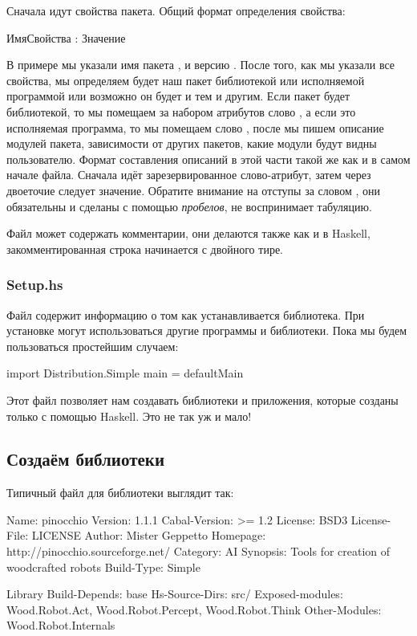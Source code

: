 Сначала идут свойства пакета. Общий формат определения свойства:

\begin{code}
ИмяСвойства : Значение
\end{code}

В примере мы указали имя пакета , и версию .
После того, как мы указали все свойства, мы определяем 
будет наш пакет библиотекой или исполняемой программой
или возможно он будет и тем и другим. Если пакет будет
библиотекой, то мы помещаем за набором атрибутов слово
, а если это исполняемая программа, то мы помещаем
слово , после мы пишем описание модулей пакета, 
зависимости от других пакетов, какие модули будут видны 
пользователю. Формат составления описаний 
в этой части такой же как и в самом начале файла. 
Сначала идёт зарезервированное слово-атрибут, затем через
двоеточие следует значение. Обратите внимание на отступы за словом
, они обязательны и сделаны с помощью \emph{пробелов},
 не воспринимает табуляцию. 

Файл  может содержать комментарии, они делаются
также как и в Haskell, закомментированная строка 
начинается с двойного тире.

\subsubsection{Setup.hs}

Файл  содержит информацию о том как устанавливается
библиотека. При установке могут использоваться другие программы
и библиотеки. Пока мы будем пользоваться простейшим случаем:

\begin{code}
import Distribution.Simple
main = defaultMain
\end{code}

Этот файл позволяет нам создавать библиотеки и приложения,
которые созданы только с помощью Haskell. Это не так уж и мало!

\subsection{Создаём библиотеки}

Типичный файл  для библиотеки выглядит так:

\begin{code}
Name:           pinocchio
Version:        1.1.1
Cabal-Version:  >= 1.2
License:        BSD3
License-File:   LICENSE
Author:         Mister Geppetto
Homepage:       http://pinocchio.sourceforge.net/
Category:       AI
Synopsis:       Tools for creation of woodcrafted robots
Build-Type:     Simple


Library
  Build-Depends: base
  Hs-Source-Dirs: src/  
  Exposed-modules:
    Wood.Robot.Act, Wood.Robot.Percept, Wood.Robot.Think
  Other-Modules:
    Wood.Robot.Internals
\end{code}


